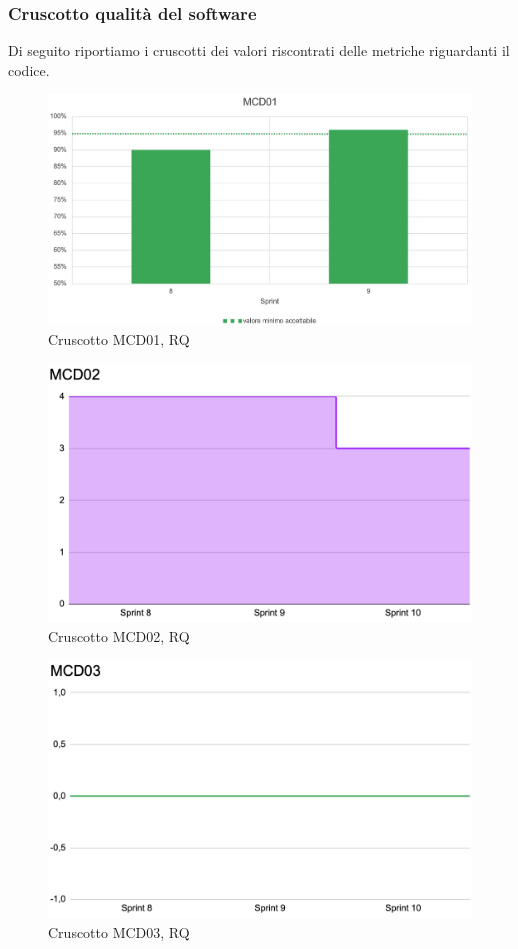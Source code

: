 \subsubsection{Cruscotto  qualità del software}
Di seguito riportiamo i cruscotti dei valori riscontrati delle metriche riguardanti il codice.
\begin{figure}[H] 
    \centering
    \includegraphics[scale = 0.63]{immagini/MCD01.png}
    \caption{Cruscotto MCD01, RQ}
\end{figure}

\begin{figure}[H] 
    \centering
    \includegraphics[scale = 0.63]{immagini/MCD02.png}
    \caption{Cruscotto MCD02, RQ}
\end{figure}

\begin{figure}[H] 
    \centering
    \includegraphics[scale = 0.63]{immagini/MCD03.png}
    \caption{Cruscotto MCD03, RQ}
\end{figure}


